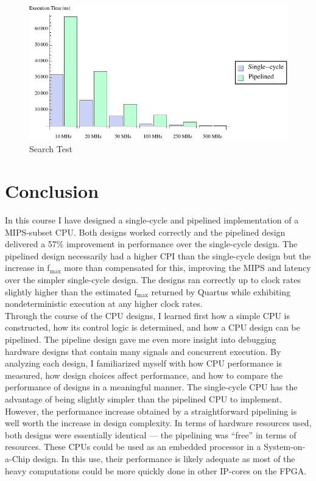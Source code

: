 \documentclass[12pt]{article}
\begin{document}
\begin{figure}
	\begin{center}
		\includegraphics{search_chart}
	\end{center}
	\caption{Search Test}
	\label{fig:search_chart}
\end{figure}

  \section{Conclusion}

In this course I have designed a single-cycle and pipelined implementation of a MIPS-subset CPU. Both designs worked correctly and the pipelined design delivered a 57\% improvement in performance over the single-cycle design. The pipelined design necessarily had a higher CPI than the single-cycle design but the increase in f$_{\textrm{max}}$ more than compensated for this, improving the MIPS and latency over the simpler single-cycle design. The designs ran correctly up to clock rates slightly higher than the estimated f$_{\textrm{max}}$ returned by Quartus while exhibiting nondeterministic execution at any higher clock rates.\\

Through the course of the CPU designs, I learned first how a simple CPU is constructed, how its control logic is determined, and how a CPU design can be pipelined. The pipeline design gave me even more insight into debugging hardware designs that contain many signals and concurrent execution. By analyzing each design, I familiarized myself with how CPU performance is measured, how design choices affect performance, and how to compare the performance of designs in a meaningful manner. The single-cycle CPU has the advantage of being slightly simpler than the pipelined CPU to implement. However, the performance increase obtained by a straightforward pipelining is well worth the increase in design complexity. In terms of hardware resources used, both designs were essentially identical --- the pipelining was ``free'' in terms of resources. These CPUs could be used as an embedded processor in a System-on-a-Chip design. In this use, their performance is likely adequate as most of the heavy computations could be more quickly done in other IP-cores on the FPGA.\\
\end{document}
